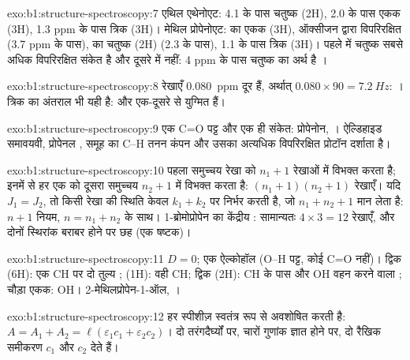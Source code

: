 \begin{solution}{exo:b1:structure-spectroscopy:7}
एथिल एथेनोएट: 4.1 के पास चतुष्क (2H), 2.0 के पास एकक (3H), 1.3 ppm के पास त्रिक
(3H)। मेथिल प्रोपेनोएट:  का एकक (3H), ऑक्सीजन द्वारा विपरिरक्षित
(3.7 ppm के पास),  का चतुष्क (2H) (2.3 के पास), 1.1 के पास त्रिक
(3H)। पहले में चतुष्क सबसे अधिक विपरिरक्षित संकेत है और
दूसरे में नहीं: 4 ppm के पास चतुष्क का अर्थ है ।
\end{solution}

\begin{solution}{exo:b1:structure-spectroscopy:8}
रेखाएँ \qty{0.080}{ppm} दूर हैं, अर्थात् $0.080 \times 90 = \qty{7.2}{Hz}$:
। त्रिक का अंतराल भी यही है:  और
 एक-दूसरे से युग्मित हैं।
\end{solution}

\begin{solution}{exo:b1:structure-spectroscopy:9}
एक C=O पट्ट और एक ही संकेत: प्रोपेनोन, । ऐल्डिहाइड
समावयवी, प्रोपेनल ,  समूह का C--H तनन कंपन
और उसका अत्यधिक विपरिरक्षित प्रोटॉन दर्शाता है।
\end{solution}

\begin{solution}{exo:b1:structure-spectroscopy:10}
पहला समुच्चय रेखा को $n_1 + 1$ रेखाओं में विभक्त करता है; इनमें से हर एक को
दूसरा समुच्चय $n_2 + 1$ में विभक्त करता है: $(n_1 + 1)(n_2 + 1)$ रेखाएँ। यदि $J_1 =
J_2$, तो किसी रेखा की स्थिति केवल $k_1 + k_2$ पर निर्भर करती है, जो $n_1 + n_2 +
1$ मान लेता है: $n + 1$ नियम, $n = n_1 + n_2$ के साथ। 1-ब्रोमोप्रोपेन का केंद्रीय :
सामान्यतः $4 \times 3 = 12$ रेखाएँ, और दोनों
स्थिरांक बराबर होने पर छह (एक षष्टक)।
\end{solution}

\begin{solution}{exo:b1:structure-spectroscopy:11}
$D = 0$; एक ऐल्कोहॉल (O--H पट्ट, कोई C=O नहीं)। द्विक (6H): एक CH पर दो तुल्य
;  (1H): वही CH; द्विक (2H): CH के पास और OH वहन करने वाला
; चौड़ा एकक: OH।
2-मेथिलप्रोपेन-1-ऑल, ।
\end{solution}

\begin{solution}{exo:b1:structure-spectroscopy:12}
हर स्पीशीज़ स्वतंत्र रूप से अवशोषित करती है: $A = A_1 + A_2 = \ell(\varepsilon_1c_1
+ \varepsilon_2c_2)$। दो तरंगदैर्घ्यों पर, चारों गुणांक ज्ञात होने पर,
दो रैखिक समीकरण $c_1$ और $c_2$ देते हैं।
\end{solution}

